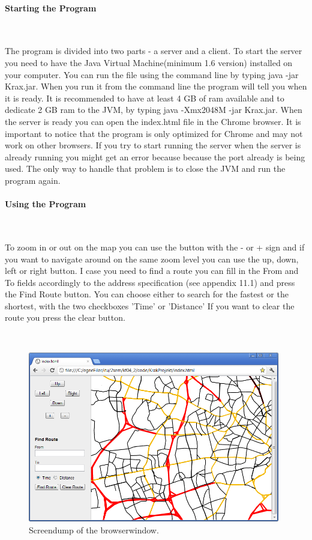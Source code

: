 \documentclass[a4paper,10pt,titlepage]{article}
\begin{document}
		\paragraph{Starting the Program}\mbox{}\
		
		The program is divided into two parts - a server and a client. To start the server you need to have the Java Virtual Machine(minimum 1.6 version) installed on your computer. You can run the file using the command line by typing java -jar Krax.jar. When you run it from the command line the program will tell you when it is ready. It is recommended to have at least 4 GB of ram available and to dedicate 2 GB ram to the JVM, by typing java -Xmx2048M -jar Krax.jar. When the server is ready you can open the index.html file in the Chrome browser. It is important to notice that the program is only optimized for Chrome and may not work on other browsers. If you try to start running the server when the server is already running you might get an error because because the port already is being used. The only way to handle that problem is to close the JVM and run the program again.  
		\paragraph{Using the Program}\mbox{}\
		
		To zoom in or out on the map you can use the button with the - or + sign and if you want to navigate around on the same zoom level you can use the up, down, left or right button. I case you need to find a route you can fill in the From and To fields accordingly to the address specification (see appendix 11.1) and press the Find Route button. You can choose either to search for the fastest or the shortest, with the two checkboxes 'Time' or 'Distance' If you want to clear the route you press the clear button.

		 \mbox{}\\
		
		\begin{figure}[H]
\includegraphics[width=110mm]{screendump.png}
\caption{Screendump of the browserwindow.}
\label{fig:screendump}
\end{figure}
		
\end{document}

